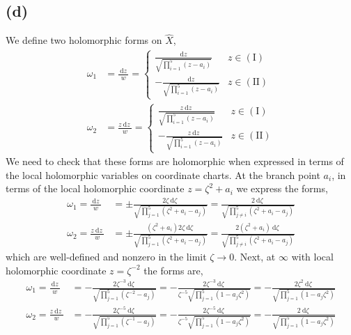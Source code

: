 \documentclass[12pt]{extarticle}
\renewcommand{\d}[1]{\: \mathrm{d}#1 \:}
\theoremstyle{definition}
\begin{document}
\subsection*{(d)}

We define two holomorphic forms on $\hat{X}$,
\begin{align*}
\omega_1 & = \frac{\d{z}}{w} = 
\begin{cases}
\frac{\d{z}}{\sqrt{\prod_{i = 1}^5 (z - a_i)}} &  z \in \mathrm{(I)}
\\
- \frac{\d{z}}{\sqrt{\prod_{i = 1}^5 (z - a_i)}} & z \in \mathrm{(II)}
\end{cases}
\\
\omega_2 & = \frac{z \d{z}}{w} = 
\begin{cases}
\frac{z \d{z}}{\sqrt{\prod_{i = 1}^5 (z - a_i)}} & z \in \mathrm{(I)}
\\
- \frac{z \d{z}}{\sqrt{\prod_{i = 1}^5 (z - a_i)}} & z \in \mathrm{(II)}
\end{cases}
\end{align*}
We need to check that these forms are holomorphic when expressed in terms of the local holomorphic variables on coordinate charts. At the branch point $a_i$, in terms of the local holomorphic coordinate $z = \zeta^2 + a_i$ we express the forms,
\begin{align*}
\omega_1 = \frac{\d{z}}{w} & = \pm \frac{2\zeta \d{\zeta}}{\sqrt{\prod_{j = 1}^5 (\zeta^2 + a_i - a_j) }} = \frac{2\d{\zeta}}{\sqrt{\prod_{j \neq i}^5 (\zeta^2 + a_i - a_j) }}
\\
\omega_2 = \frac{z \d{z}}{w} & = \pm \frac{(\zeta^2 + a_i) 2 \zeta \d{\zeta}}{\sqrt{\prod_{j = 1}^5 (\zeta^2 + a_i - a_j) }} = \frac{2 (\zeta^2 + a_i) \d{\zeta}}{\sqrt{\prod_{j \neq i}^5 (\zeta^2 + a_i - a_j) }}
\end{align*}
which are well-defined and nonzero in the limit $\zeta \to 0$. Next, at $\infty$ with local holomorphic coordinate $z = \zeta^{-2}$ the forms are,
\begin{align*}
\omega_1 = \frac{\d{z}}{w} & = - \frac{2\zeta^{-3} \d{\zeta}}{\sqrt{\prod_{j = 1}^5 (\zeta^{-2} - a_j) }} = - \frac{2\zeta^{-3} \d{\zeta}}{\zeta^{-5} \sqrt{\prod_{j = 1}^5 (1 - a_j \zeta^2) }} = - \frac{2 \zeta^2 \d{\zeta}}{\sqrt{\prod_{j = 1}^5 (1 - a_j \zeta^2)}} 
\\
\omega_2 = \frac{z\d{z}}{w} & = - \frac{2 \zeta^{-5} \d{\zeta}}{\sqrt{\prod_{j = 1}^5 (\zeta^{-1} - a_j) }} = - \frac{2 \zeta^{-5} \d{\zeta}}{\zeta^{-5} \sqrt{\prod_{j = 1}^5 (1 - a_j \zeta^2) }} = - \frac{2 \d{\zeta}}{\sqrt{\prod_{j = 1}^5 (1 - a_j \zeta^2)}} 
\end{align*}
\end{document}
